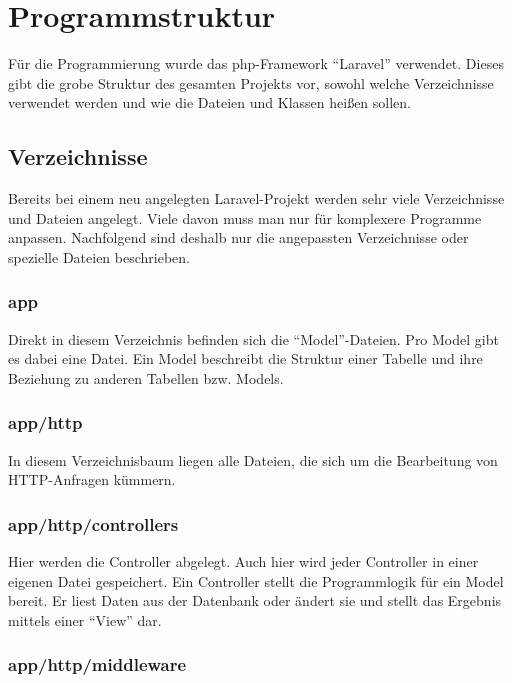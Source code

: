 \section{Programmstruktur}

Für die Programmierung wurde das php-Framework "`Laravel"' verwendet. Dieses gibt die grobe Struktur des gesamten Projekts vor, sowohl welche Verzeichnisse verwendet werden und wie die Dateien und Klassen heißen sollen.

\subsection{Verzeichnisse}

Bereits bei einem neu angelegten Laravel-Projekt werden sehr viele Verzeichnisse und Dateien angelegt. Viele davon muss man nur für komplexere Programme anpassen. Nachfolgend sind deshalb nur die angepassten Verzeichnisse oder spezielle Dateien beschrieben.

\subsubsection{app}

Direkt in diesem Verzeichnis befinden sich die "`Model"'-Dateien. Pro Model gibt es dabei eine Datei. Ein Model beschreibt die Struktur einer Tabelle und ihre Beziehung zu anderen Tabellen bzw. Models.

\subsubsection{app/http}

In diesem Verzeichnisbaum liegen alle Dateien, die sich um die Bearbeitung von HTTP-Anfragen kümmern.

\subsubsection{app/http/controllers}

Hier werden die Controller abgelegt. Auch hier wird jeder Controller in einer eigenen Datei gespeichert. Ein Controller stellt die Programmlogik für ein Model bereit. Er liest Daten aus der Datenbank oder ändert sie und stellt das Ergebnis mittels einer "`View"' dar.

\subsubsection{app/http/middleware} 

